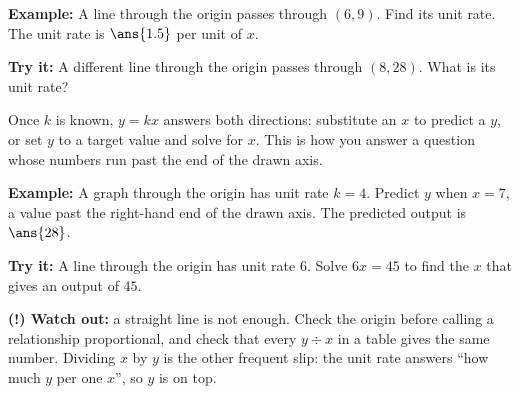 \documentclass[12pt]{article}
\begin{document}
\begin{examplebox}
\textbf{Example:} A line through the origin passes through $(6, 9)$. Find its
unit rate.
The unit rate is $\ans{1.5}$ per unit of $x$.
\end{examplebox}

\begin{tryitbox}
\textbf{Try it:} A different line through the origin passes through $(8, 28)$.
What is its unit rate?\\[2pt]
\end{tryitbox}


\begin{formulabox}
Once $k$ is known, $y = kx$ answers both directions: substitute an $x$ to
predict a $y$, or set $y$ to a target value and solve for $x$. This is how you
answer a question whose numbers run past the end of the drawn axis.
\end{formulabox}

\begin{examplebox}
\textbf{Example:} A graph through the origin has unit rate $k = 4$. Predict $y$
when $x = 7$, a value past the right-hand end of the drawn axis.
The predicted output is $\ans{28}$.
\end{examplebox}

\begin{tryitbox}
\textbf{Try it:} A line through the origin has unit rate $6$. Solve
$6x = 45$ to find the $x$ that gives an output of $45$.\\[2pt]
\end{tryitbox}

\begin{watchoutbox}
\textbf{(!) Watch out:} a straight line is not enough. Check the origin before
calling a relationship proportional, and check that every $y \div x$ in a table
gives the same number. Dividing $x$ by $y$ is the other frequent slip: the unit
rate answers ``how much $y$ per one $x$'', so $y$ is on top.
\end{watchoutbox}
\end{document}
